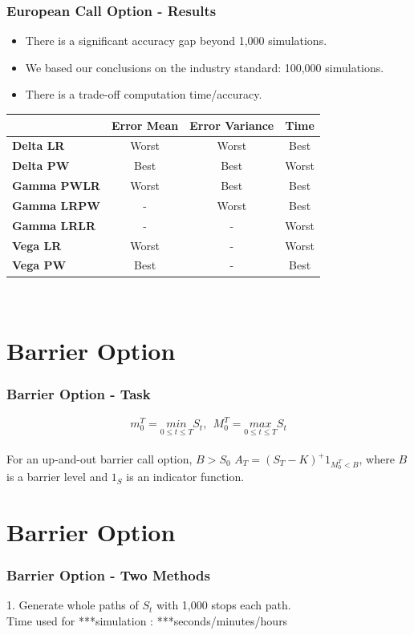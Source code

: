 \documentclass[12pt]{beamer}
\begin{document}
\begin{frame}
\frametitle{European Call Option - Results}
\begin{itemize}
  \item There is a significant accuracy gap beyond 1,000 simulations.
  \item We based our conclusions on the industry standard: 100,000 simulations.
  \item There is a trade-off computation time/accuracy.
\end{itemize}



\begin{table}
  \centering
\begin{tabular}{|l|c|c|c|}
\hline
& \textbf{Error Mean} & \textbf{Error Variance} & \textbf{Time} \\ \hline
\textbf{Delta LR} & Worst & Worst & Best\\
\textbf{Delta PW} & Best & Best & Worst\\ \hline
\textbf{Gamma PWLR} & Worst & Best & Best\\
\textbf{Gamma LRPW} & - & Worst & Best\\
\textbf{Gamma LRLR} & - & - & Worst\\ \hline
\textbf{Vega LR} & Worst & - & Worst\\
\textbf{Vega PW} & Best & - & Best\\ \hline
\end{tabular}\\

\end{table}

\end{frame}




\section{Barrier Option}
\begin{frame}
\frametitle{Barrier Option - Task}
$$m^T_{0} =\underset{0 \leq t \leq T}{min}  S_t, \ \   M^T_{0} = \underset{0 \leq t \leq T}{max} S_t$$\\

For an up-and-out barrier call option, $B > S_0$ $A_T=(S_T-K)^+1_{M^T_0 < B}$, where $B$ is a barrier level and $1_S$ is an indicator function.

\end{frame}

\section{Barrier Option}
\begin{frame}
\frametitle{Barrier Option - Two Methods}

1. Generate whole paths of $S_t$ with 1,000 stops each path.\\

Time used for ***simulation : ***seconds/minutes/hours

\end{frame}
\end{document}
